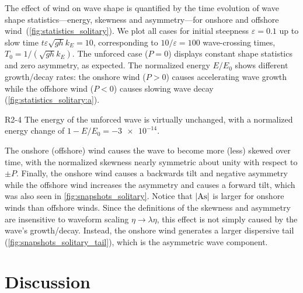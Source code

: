 \documentclass{jfm}
\DeclareMathOperator{\As}{As}
\renewcommand*{\epsilon}{\varepsilon}
\begin{document}
The effect of wind on wave shape is quantified by the time evolution of
wave shape statistics---energy, skewness and asymmetry---for onshore
and offshore wind~(\cref{fig:statistics_solitary}).
We plot all cases for initial steepness $\epsilon = 0.1$ up to slow time
$t \epsilon \sqrt{g h} k_E = 10$, corresponding to $10/\epsilon = 100$
wave-crossing times, $T_0 = 1/(\sqrt{gh} k_E)$.
The unforced case ($P=0$) displays constant shape statistics and zero
asymmetry, as expected.
The normalized energy $E/E_0$ shows different growth/decay rates:
the onshore wind ($P>0$) causes accelerating wave growth while the
offshore wind ($P<0$) causes slowing wave decay
(\cref{fig:statistics_solitary:a}).
\begin{LineLabel}{R2-4}
The energy of the unforced wave is virtually unchanged, with a
normalized energy change of $1-E/E_0 = \num{-3e-14}$.
\end{LineLabel}
The onshore (offshore) wind causes the wave to become more (less) skewed
over time, with the normalized skewness nearly symmetric about unity
with respect to $\pm P$.
Finally, the onshore wind causes a backwards tilt and negative asymmetry
while the offshore wind increases the asymmetry and causes a forward
tilt, which was also seen in \cref{fig:snapshots_solitary}.
Notice that $\abs{\As}$ is larger for onshore winds than offshore winds.
Since the definitions of the skewness and asymmetry are insensitive to
waveform scaling $\eta \to \lambda \eta$, this effect is not simply
caused by the wave's growth/decay.
Instead, the onshore wind generates a larger dispersive tail
(\cref{fig:snapshots_solitary_tail}), which is the asymmetric wave
component.

\section{\label{sec:discussion} Discussion}
\end{document}
